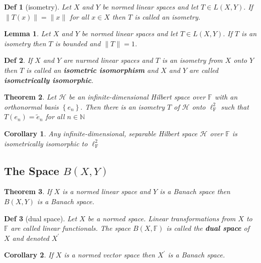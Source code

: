 \documentclass[10pt]{paper}
\newtheorem{theorem}{Theorem}[section]
\newtheorem{definition}{Def}[section]
\newtheorem{corollary}{Corollary}[section]
\newtheorem{lemma}[theorem]{Lemma}
\begin{document}
\begin{definition}[isometry]
    Let $X$ and $Y$ be normed linear spaces and let $T \in L(X, Y) .$ If $\|T(x)\|=\|x\|$ for all $x \in X$ then $T$ is called an isometry.
\end{definition}

\begin{lemma}
    Let $X$ and $Y$ be normed linear spaces and let $T \in L(X, Y) .$ If $T$ is an isometry then $T$ is bounded and $\|T\|=1$.
\end{lemma}

\begin{definition}
    If $X$ and $Y$ are nurmed linear spaces and $T$ is an isometry from $X$ onto $Y$ then $T$ is called an \textbf{isometric isomorphism} and $X$ and $Y$ are called \textbf{isometrically isomorphic}.
\end{definition}

\begin{theorem}
    Let $\mathcal{H}$ be an infinite-dimensional Hilbert space over $\mathbb{F}$ with an orthonormal basis $\left\{e_{n}\right\} .$ Then there is an isometry $T$ of $\mathcal{H}$ onto $\ell_{\mathrm{F}}^{2}$ such that $T\left(e_{n}\right)=\widetilde{e}_{n}$ for all $n \in \mathbb{N}$
\end{theorem}

\begin{corollary}
    Any infinite-dimensional, separable Hilbert space $\mathcal{H}$ over $\mathbb{F}$ is isometrically isomorphic to $\ell_{\mathrm{F}}^{2}$
\end{corollary}

\subsection{The Space $B(X, Y)$}

\begin{theorem}
    If $X$ is a normed linear space and $Y$ is a Banach space then $B(X, Y)$ is a Banach space.
\end{theorem}

\begin{definition}[dual space]
    Let $X$ be a normed space. Linear transformations from $X$ to $\mathbb{F}$ are called linear functionals. The space $B(X, \mathbb{F})$ is called the \textbf{dual space} of $X$ and denoted $X^{\prime}$
\end{definition}

\begin{corollary}
    If $X$ is a normed vector space then $X^{\prime}$ is a Banach space.
\end{corollary}
\end{document}
